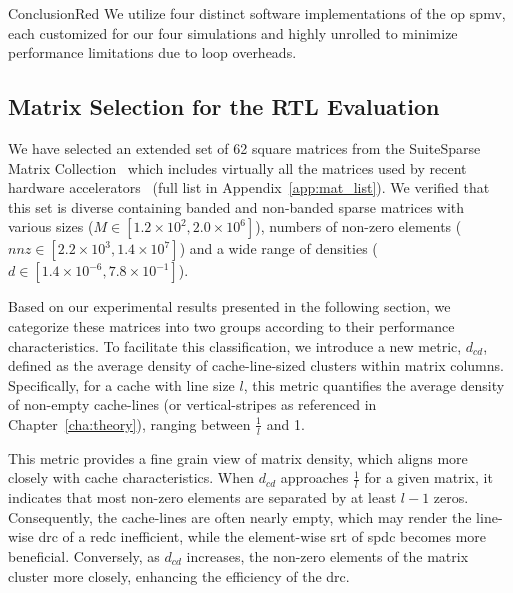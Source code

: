 \begin{highlight}{Conclusion}{Red}
    We utilize four distinct software implementations of the \acrshort{op} \acrshort{spmv}, each customized for our four simulations and highly unrolled to minimize performance limitations due to loop overheads.
\end{highlight}

\subsection{Matrix Selection for the RTL Evaluation}

We have selected an extended set of 62 square matrices from the SuiteSparse Matrix Collection~\cite{Kolodziej2019_SuiteSparse} which includes virtually all the matrices used by recent hardware accelerators~\cite{Zhang2021_Gamma, Xie2021_SpaceA, Zhang2022_ASA, Srikanth2021_SortCache, Pal2018_OuterSPACE} (full list in Appendix~\ref{app:mat_list}).
We verified that this set is diverse containing \gls{banded} and non-\gls{banded} sparse matrices with various sizes ($M \in [1.2\times10^{2}, 2.0\times10^{6}]$), numbers of non-zero elements ($nnz \in [2.2\times10^{3}, 1.4\times10^{7}]$) and a wide range of densities ($d \in [1.4\times10^{-6}, 7.8\times10^{-1}]$).

Based on our experimental results presented in the following section, we categorize these matrices into two groups according to their performance characteristics.
To facilitate this classification, we introduce a new metric, $d_\mathit{cd}$, defined as the average density of cache-line-sized clusters within matrix columns.
Specifically, for a cache with line size $l$, this metric quantifies the average density of non-empty cache-lines (or vertical-stripes as referenced in Chapter~\ref{cha:theory}), ranging between $\frac{1}{l}$ and 1.

This metric provides a fine grain view of matrix density, which aligns more closely with cache characteristics.
When $d_\mathit{cd}$ approaches $\frac{1}{l}$ for a given matrix, it indicates that most non-zero elements are separated by at least $l-1$ zeros.
Consequently, the cache-lines are often nearly empty, which may render the line-wise \acrshort{drc} of a \acrshort{redc} inefficient, while the element-wise \acrshort{srt} of \acrlong{spdc} becomes more beneficial.
Conversely, as $d_\mathit{cd}$ increases, the non-zero elements of the matrix cluster more closely, enhancing the efficiency of the \acrshort{drc}.

